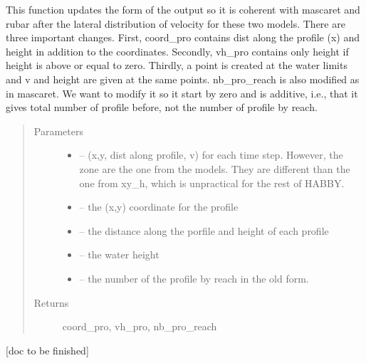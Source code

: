 \documentclass[letterpaper,10pt,english]{sphinxmanual}
\begin{document}

\begin{fulllineitems}
\label{\detokenize{index:src.Hec_ras06.update_output}}
This function updates the form of the output so it is coherent with mascaret and rubar after the lateral
distribution of velocity for these two models. There are three important changes. First, coord\_pro contains dist along
the profile (x) and height in addition to the coordinates. Secondly, vh\_pro contains only height if height is above
or equal to zero. Thirdly, a point is created at the water limits and v and height are given at the same points.
nb\_pro\_reach is also modified as in mascaret. We want to modify it so it start by zero and is additive, i.e., that
it gives total number of profile before, not the number of profile by reach.
\begin{quote}\begin{description}
\item[{Parameters}] \leavevmode\begin{itemize}
\item {} 
 -- (x,y, dist along profile, v) for each time step. However, the zone are the one from the models.
They are different than the one from xy\_h, which is unpractical for the rest of HABBY.

\item {} 
 -- the (x,y) coordinate for the profile

\item {} 
 -- the distance along the porfile and height of each profile

\item {} 
 -- the water height

\item {} 
 -- the number of the profile by reach in the old form.

\end{itemize}

\item[{Returns}] \leavevmode
coord\_pro, vh\_pro, nb\_pro\_reach

\end{description}\end{quote}

{[}doc to be finished{]}

\end{fulllineitems}
\end{document}
